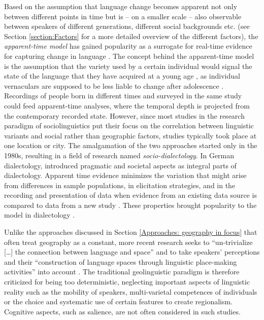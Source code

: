 \documentclass[output=paper]{langscibook}
\begin{document}
Based on the assumption that language change becomes apparent not only between different points in time but is -- on a smaller scale -- also observable between speakers of different generations, different social backgrounds etc. (see Section \ref{section:Factors} for a more detailed overview of the different factors), the \textit{apparent-time model} has gained popularity as a surrogate for real-time evidence for capturing change in language \parencite[cf.][]{Labov1963,Bailey1991,Cukor-Avila2013}. 
The concept behind the apparent-time model is the assumption that the variety used by a certain individual would signal the state of the language that they have acquired at a young age \parencite{Labov1999,Schilling-Estes2005}, as individual vernaculars are supposed to be less liable to change after adolescence \parencite[cf.][320]{Bailey2002}. Recordings of people born in different times and surveyed in the same study could feed apparent-time analyses, where the temporal depth is projected from the contemporary recorded state. 
However, since most studies in the research paradigm of sociolinguistics put their focus on the correlation between linguistic variants and social rather than geographic factors, studies typically took place at one location or city. The amalgamation of the two approaches started only in the 1980s, resulting in a field of research named \textit{socio-dialectology}. In German dialectology, \textcite{Mattheier1980} introduced pragmatic and societal aspects as integral parts of dialectology.
Apparent time evidence minimizes the variation that might arise from differences in sample populations, in elicitation strategies, and in the recording and presentation of data when evidence from an existing data source is compared to data from a new study \parencite{Bailey2002}. These properties brought popularity to the model in dialectology \parencite[for a review, see][64--65]{BeamanThesis2020}.

Unlike the approaches discussed in Section \ref{Approaches: geography in focus} that often treat geography as a constant, more recent research seeks to “un-trivialize […] the connection between language and space” and to take speakers’ perceptions and their “construction of language spaces through linguistic place-making activities” into account \parencite[][1]{Auer2013}. The traditional geolinguistic paradigm is therefore criticized for being too deterministic, neglecting important aspects of linguistic reality such as the  mobility of speakers, multi-varietal competences of individuals or the choice and systematic use of certain features to create regionalism. Cognitive aspects, such as salience, are not often considered in such studies. 
\end{document}

